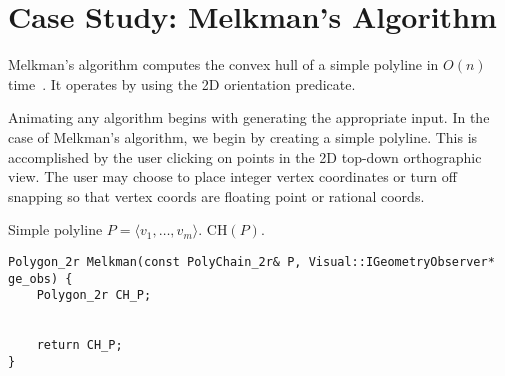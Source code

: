 
\FloatBarrier
\section{Case Study: Melkman's Algorithm}

Melkman's algorithm computes the convex hull of a simple polyline in $O(n)$
time~\cite{melkman1987line}. It operates by using the 2D orientation predicate.

Animating any algorithm begins with generating the appropriate input. In the
case of Melkman's algorithm, we begin by creating a simple polyline. This is
accomplished by the user clicking on points in the 2D top-down orthographic
view. The user may choose to place integer vertex coordinates or turn off
snapping so that vertex coords are floating point or rational coords.

\begin{mdframed}[linecolor=white, backgroundcolor=algback, frametitle={Algorithm
Melkman}] \begin{algorithmic}[1]    
    \Require Simple polyline $P = \langle v_1, \ldots, v_m \rangle$.
    \Ensure $\text{CH}(P)$.
    \vspace{0.75em}
    \EndProcedure
\end{algorithmic}
\end{mdframed} 

\begin{lstlisting}
Polygon_2r Melkman(const PolyChain_2r& P, Visual::IGeometryObserver* ge_obs) {
    Polygon_2r CH_P;


    return CH_P;
}
\end{lstlisting}